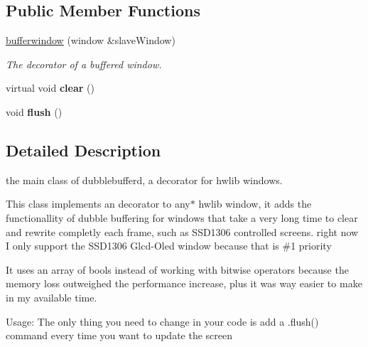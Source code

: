 \subsection*{Public Member Functions}
\begin{DoxyCompactItemize}
\item 
\hyperlink{classhwlib_1_1bufferwindow_ab7b3cae85b441cfc9123201b30b86dae}{bufferwindow} (window \&slave\+Window)
\begin{DoxyCompactList}\small\item\em The decorator of a buffered window. \end{DoxyCompactList}\item 
\hypertarget{classhwlib_1_1bufferwindow_abfe7d7caa932892ca025d1dab49b13d4}{virtual void {\bfseries clear} ()}\label{classhwlib_1_1bufferwindow_abfe7d7caa932892ca025d1dab49b13d4}

\item 
\hypertarget{classhwlib_1_1bufferwindow_aa25f7a689ad5328e457c963b7a348d81}{void {\bfseries flush} ()}\label{classhwlib_1_1bufferwindow_aa25f7a689ad5328e457c963b7a348d81}

\end{DoxyCompactItemize}


\subsection{Detailed Description}
the main class of dubblebufferd, a decorator for hwlib windows. 

This class implements an decorator to any$\ast$ hwlib window, it adds the functionallity of dubble buffering for windows that take a very long time to clear and rewrite completly each frame, such as S\+S\+D1306 controlled screens. right now I only support the S\+S\+D1306 Glcd-\/\+Oled window because that is \#1 priority

It uses an array of bools instead of working with bitwise operators because the memory loss outweighed the performance increase, plus it was way easier to make in my available time.

Usage\+: The only thing you need to change in your code is add a .flush() command every time you want to update the screen 

